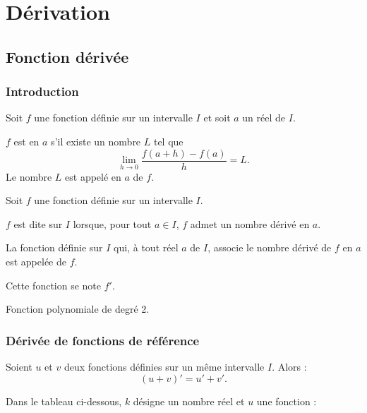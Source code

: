 \documentclass[10pt,openright,twoside,french]{book}
\begin{document}
\chapter{Dérivation}\label{ch_derivation}

\section{Fonction  dérivée}
\subsection{Introduction}
\begin{Defi}
	Soit $f$ une fonction définie sur un intervalle $I$ et soit $a$ un réel de $I$.\par
	$f$ est  en $a$ s'il existe un nombre $L$ tel que
	\[\lim_{h \to 0} \dfrac{f(a + h) - f(a)}{h} = L.\]
	Le nombre $L$ est appelé  en $a$ de $f$.
\end{Defi}

\begin{Defi}
	Soit $f$ une fonction définie sur un intervalle $I$.\par
	$f$ est dite  sur $I$ lorsque, pour tout $a \in I$, $f$ admet un nombre dérivé en $a$.\par
	La fonction définie sur $I$ qui, à tout réel $a$ de $I$, associe le nombre dérivé de $f$ en $a$ est appelée  de $f$.\par
	Cette fonction se note $f'$.
\end{Defi}

\begin{Exemple}
	Fonction polynomiale de degré 2.
\end{Exemple}

\subsection{Dérivée de fonctions de référence}

\begin{Prop}
    Soient $u$ et $v$ deux fonctions définies sur un même intervalle $I$. Alors :
    \[(u+v)' = u' + v'.\]
\end{Prop}

Dans le tableau ci-dessous, $k$ désigne un nombre réel et $u$ une fonction :
\end{document}
